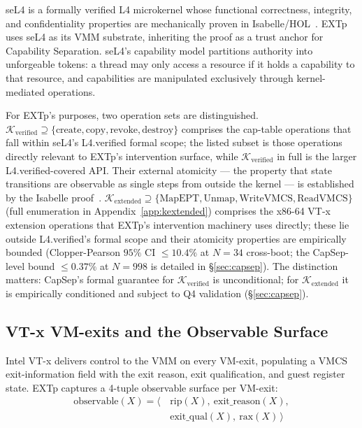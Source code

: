 \documentclass[conference]{IEEEtran}
\newcommand{\Kverified}{\mathcal{K}_\text{verified}}
\newcommand{\Kextended}{\mathcal{K}_\text{extended}}
\begin{document}
seL4 is a formally verified L4 microkernel whose functional
correctness, integrity, and confidentiality properties are
mechanically proven in
Isabelle/HOL~\cite{klein2009sel4,klein2014sel4}. EXTp uses seL4 as
its VMM substrate, inheriting the proof as a trust anchor for
Capability Separation. seL4's capability model partitions authority
into unforgeable tokens: a thread may only access a resource if it
holds a capability to that resource, and capabilities are manipulated
exclusively through kernel-mediated operations.

For EXTp's purposes, two operation sets are distinguished.
$\Kverified \supseteq \{\text{create}, \text{copy}, \text{revoke},
\text{destroy}\}$ comprises the cap-table operations that fall
within seL4's L4.verified formal scope; the listed subset is
those operations directly relevant to EXTp's intervention surface,
while $\Kverified$ in full is the larger L4.verified-covered
API. Their external atomicity --- the property that state
transitions are observable as single steps from outside the
kernel --- is established by the Isabelle
proof~\cite{klein2009sel4}. $\Kextended \supseteq \{\text{MapEPT},
\text{Unmap}, \text{WriteVMCS}, \text{ReadVMCS}\}$ (full enumeration
in Appendix~\ref{app:kextended}) comprises the x86-64 VT-x extension
operations that EXTp's intervention machinery uses directly; these
lie outside L4.verified's formal scope and their atomicity properties
are empirically bounded (Clopper-Pearson $95\%$ CI $\leq 10.4\%$ at
$N{=}34$ cross-boot; the CapSep-level bound $\leq 0.37\%$ at $N{=}998$
is detailed in \S\ref{sec:capsep}). The distinction matters: CapSep's
formal guarantee for $\Kverified$ is unconditional; for $\Kextended$
it is empirically conditioned and subject to Q4 validation
(\S\ref{sec:capsep}).

\subsection{VT-x VM-exits and the Observable Surface}

Intel VT-x delivers control to the VMM on every VM-exit, populating
a VMCS exit-information field with the exit reason, exit
qualification, and guest register state. EXTp captures a 4-tuple
observable surface per VM-exit:
\begin{equation}
\begin{aligned}
\text{observable}(X) = \langle\,&\text{rip}(X),\ \text{exit\_reason}(X), \\
                                &\text{exit\_qual}(X),\ \text{rax}(X)\,\rangle
\end{aligned}
\end{equation}
\end{document}
